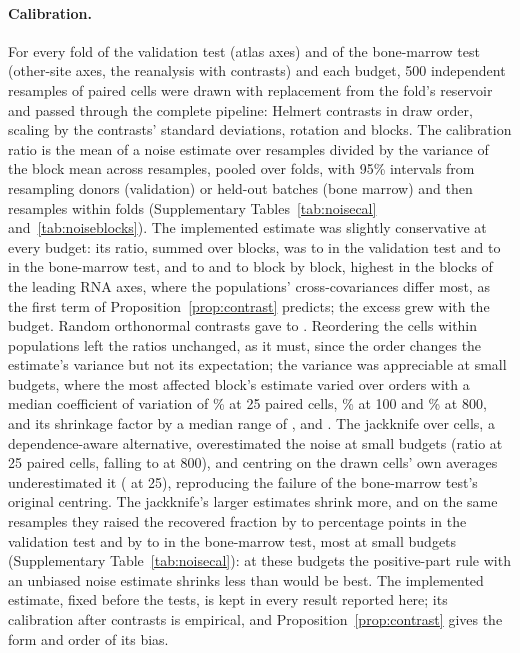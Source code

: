 \paragraph{Calibration.} For every fold of the validation test (atlas axes) and of the bone-marrow test (other-site axes, the reanalysis with contrasts) and each budget, 500 independent resamples of paired cells were drawn with replacement from the fold's reservoir and passed through the complete pipeline: Helmert contrasts in draw order, scaling by the contrasts' standard deviations, rotation and blocks. The calibration ratio is the mean of a noise estimate over resamples divided by the variance of the block mean across resamples, pooled over folds, with 95\% intervals from resampling donors (validation) or held-out batches (bone marrow) and then resamples within folds (Supplementary Tables~\ref{tab:noisecal} and~\ref{tab:noiseblocks}). The implemented estimate was slightly conservative at every budget: its ratio, summed over blocks, was \RvCalValMin{} to \RvCalValMax{} in the validation test and \RvCalBmMin{} to \RvCalBmMax{} in the bone-marrow test, and \RvCalValBlockMin{} to \RvCalValBlockMax{} and \RvCalBmBlockMin{} to \RvCalBmBlockMax{} block by block, highest in the blocks of the leading RNA axes, where the populations' cross-covariances differ most, as the first term of Proposition~\ref{prop:contrast} predicts; the excess grew with the budget. Random orthonormal contrasts gave \RvCalValOrthoMin{} to \RvCalValOrthoMax. Reordering the cells within populations left the ratios unchanged, as it must, since the order changes the estimate's variance but not its expectation; the variance was appreciable at small budgets, where the most affected block's estimate varied over orders with a median coefficient of variation of \RvCalValOrderCvMax\% at 25 paired cells, \RvCalValOrderCvHundred\% at 100 and \RvCalValOrderCvEight\% at 800, and its shrinkage factor by a median range of \RvCalValOrderFactorMax, \RvCalValOrderFactorHundred{} and \RvCalValOrderFactorEight. The jackknife over cells, a dependence-aware alternative, overestimated the noise at small budgets (ratio \RvCalValJackMax{} at 25 paired cells, falling to \RvCalValJackMin{} at 800), and centring on the drawn cells' own averages underestimated it (\RvCalValOwnMin{} at 25), reproducing the failure of the bone-marrow test's original centring. The jackknife's larger estimates shrink more, and on the same resamples they raised the recovered fraction by \RvCalValJackGainMin{} to \RvCalValJackGainMax{} percentage points in the validation test and by \RvCalBmJackGainMin{} to \RvCalBmJackGainMax{} in the bone-marrow test, most at small budgets (Supplementary Table~\ref{tab:noisecal}): at these budgets the positive-part rule with an unbiased noise estimate shrinks less than would be best. The implemented estimate, fixed before the tests, is kept in every result reported here; its calibration after contrasts is empirical, and Proposition~\ref{prop:contrast} gives the form and order of its bias.

